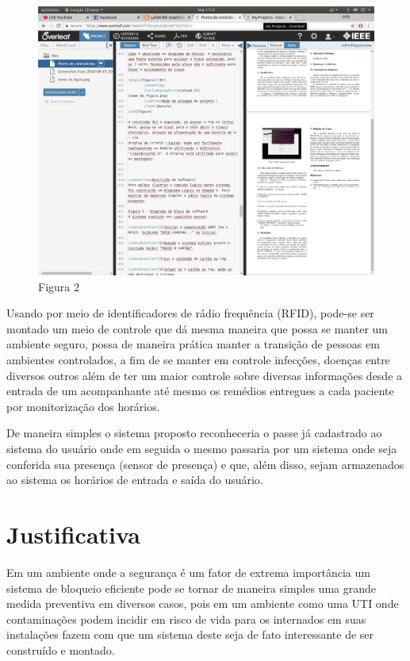 \documentclass[conference,compsoc]{IEEEtran}
\begin{document}
\begin{figure}[!ht]
		\centering
		\includegraphics[scale=0.15]{nome_da_figura2.png}
		\caption{Figura 2}
\end{figure}

Usando por meio de identificadores de rádio frequência (RFID), pode-se ser montado um meio de controle que dá mesma maneira que possa se manter um ambiente seguro, possa de maneira prática manter a transição de pessoas em ambientes controlados, a fim de se manter em controle infecções, doenças entre diversos outros além de ter um maior controle sobre diversas informações desde a entrada de um acompanhante até mesmo os remédios entregues a cada paciente por monitorização dos horários.

De maneira simples o sistema proposto reconheceria o passe já cadastrado ao sistema do usuário onde em seguida o mesmo passaria por um sistema onde seja conferida sua presença (sensor de presença) e que, além disso, sejam armazenados ao sistema os horários de entrada e saída do usuário.


\section{Justificativa}
Em um ambiente onde a segurança é um fator de extrema importância um sistema de bloqueio eficiente pode se tornar de maneira simples uma grande medida preventiva em diversos casos, pois em um ambiente como uma UTI onde contaminações podem incidir em risco de vida para os internados em suas instalações fazem com que um sistema deste seja de fato interessante de ser construído e montado.
\end{document}
